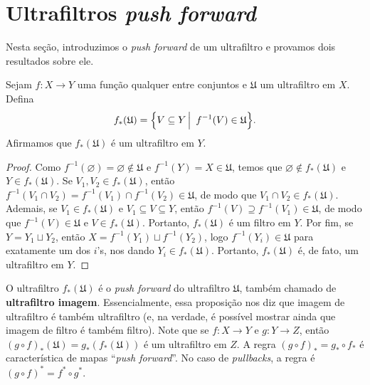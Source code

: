 \section{Ultrafiltros \textit{push forward}}
\label{sec:push_forward}

 Nesta seção, introduzimos o \textit{push forward}
 de um ultrafiltro e provamos dois resultados sobre ele.
 \begin{proposition}
 \label{prop:imag_ultrafiltro}
 Sejam 
 $f:X \to Y$
 uma função qualquer entre conjuntos e
 $\mathfrak{U}$
 um ultrafiltro em $X$. Defina
 \begin{equation*}
     f_{*}(\mathfrak{U})
     =
     \setsuchthat{V \subseteq Y}{f^{-1}(V) \in \mathfrak{U}}.
 \end{equation*}
 Afirmamos que 
 $f_{*}(\mathfrak{U})$
 é um ultrafiltro em $Y$.
 \end{proposition}
 
 \begin{proof}
 Como
 $f^{-1}(\varnothing) = \varnothing \notin \mathfrak{U}$
 e
 $f^{-1}(Y) = X \in \mathfrak{U}$,
 temos que
 $\varnothing \notin f_*(\mathfrak{U})$
 e
 $Y \in f_*(\mathfrak{U})$.
 Se 
 $V_1, V_2 \in f_*(\mathfrak{U})$,
 então
 $f^{-1}(V_1 \cap V_2) = f^{-1}(V_1) \cap f^{-1}(V_2) \in \mathfrak{U}$,
 de modo que
 $V_1 \cap V_2 \in f_*(\mathfrak{U})$.
 Ademais, se
 $V_1 \in f_*(\mathfrak{U})$
 e
 $V_1 \subseteq V \subseteq Y$,
 então
 $f^{-1}(V) \supseteq f^{-1}(V_1) \in \mathfrak{U}$,
 de modo que
 $f^{-1}(V) \in \mathfrak{U}$
 e
 $V \in f_*(\mathfrak{U})$.
 Portanto, 
 $f_*(\mathfrak{U})$
 é um filtro em 
 $Y$. 
 Por fim, se
 $Y = Y_1 \sqcup Y_2$,
 então
 $X = f^{-1}(Y_1) \sqcup f^{-1}(Y_2)$,
 logo
 $f^{-1}(Y_i) \in \mathfrak{U}$
 para exatamente um dos
 $i$'s,
 nos dando
 $Y_i \in f_*(\mathfrak{U})$.
 Portanto,
 $f_*(\mathfrak{U})$
 é, de fato, um ultrafiltro em
 $Y$.
 \end{proof}
 
 O ultrafiltro
 $f_*(\mathfrak{U})$ 
 é o \textit{push forward} do ultrafiltro
 $\mathfrak{U}$,
 também chamado de \textbf{ultrafiltro imagem}.
 Essencialmente, essa proposição nos diz que
 imagem de ultrafiltro é também ultrafiltro 
 (e, na verdade, é possível mostrar ainda que
 imagem de filtro é também filtro).
 Note que se
 $f : X \to Y$
 e
 $g : Y \to Z$,
 então
 $(g \circ f)_*(\mathfrak{U}) = g_*(f_*(\mathfrak{U}))$
 é um ultrafiltro em 
 $Z$.
 A regra
 $(g \circ f)_* = g_* \circ f_*$
 é característica de mapas ``\textit{push forward}''.
 No caso de \textit{pullbacks}, a regra é
 $(g \circ f)^* = f^* \circ g^*$.
 

